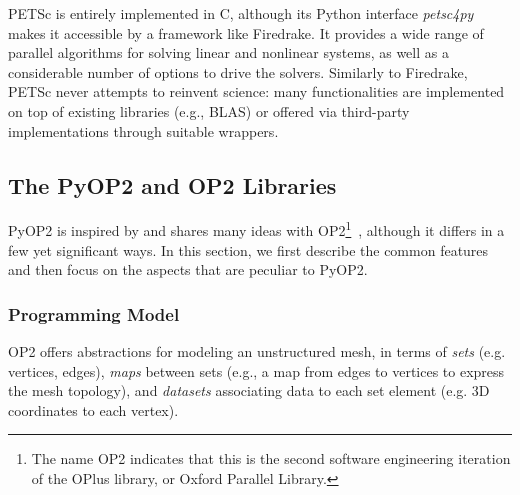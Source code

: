PETSc is entirely implemented in C, although its Python interface {\em petsc4py} makes it accessible by a framework like Firedrake. It provides a wide range of parallel algorithms for solving linear and nonlinear systems, as well as a considerable number of options to drive the solvers. Similarly to Firedrake, PETSc never attempts to reinvent science: many functionalities are implemented on top of existing libraries (e.g., BLAS) or offered via third-party implementations through suitable wrappers.


\subsection{The PyOP2 and OP2 Libraries}
\label{sec:bkg:op2}
PyOP2 is inspired by and shares many ideas with OP2\footnote{The name OP2 indicates that this is the second software engineering iteration of the OPlus library, or Oxford Parallel Library.}~\citep{op2-main}, although it differs in a few yet significant ways. In this section, we first describe the common features and then focus on the aspects that are peculiar to PyOP2.

\subsubsection{Programming Model}

OP2 offers abstractions for modeling an unstructured mesh, in terms of {\em sets} (e.g. vertices, edges), {\em maps} between sets (e.g., a map from edges to vertices to express the mesh topology), and {\em datasets} associating data to each set element (e.g. 3D coordinates to each vertex).

